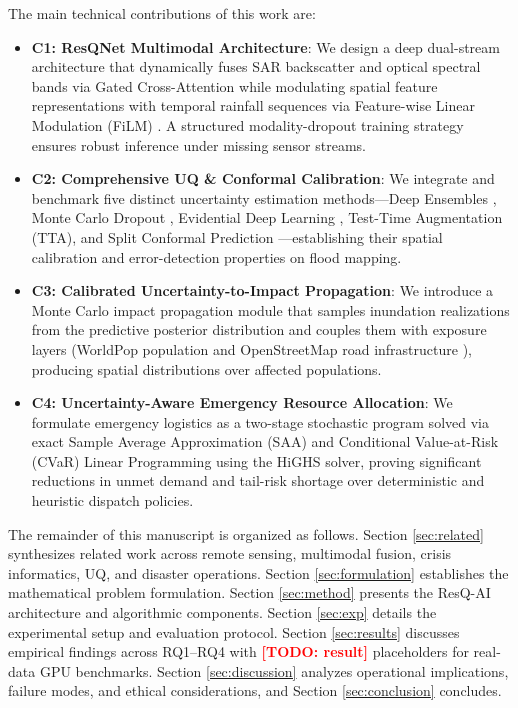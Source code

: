 \documentclass[journal]{IEEEtran}
\newcommand{\TODO}[1]{\textcolor{red}{\textbf{[TODO: #1]}}}
\begin{document}
The main technical contributions of this work are:
\begin{itemize}
    \item \textbf{C1: ResQNet Multimodal Architecture}: We design a deep dual-stream architecture that dynamically fuses SAR backscatter and optical spectral bands via Gated Cross-Attention while modulating spatial feature representations with temporal rainfall sequences via Feature-wise Linear Modulation (FiLM) \cite{perez2018film}. A structured modality-dropout training strategy ensures robust inference under missing sensor streams.
    \item \textbf{C2: Comprehensive UQ & Conformal Calibration}: We integrate and benchmark five distinct uncertainty estimation methods—Deep Ensembles \cite{lakshminarayanan2017}, Monte Carlo Dropout \cite{gal2016}, Evidential Deep Learning \cite{sensoy2018, amini2020}, Test-Time Augmentation (TTA), and Split Conformal Prediction \cite{angelopoulos2021}—establishing their spatial calibration and error-detection properties on flood mapping.
    \item \textbf{C3: Calibrated Uncertainty-to-Impact Propagation}: We introduce a Monte Carlo impact propagation module that samples inundation realizations from the predictive posterior distribution and couples them with exposure layers (WorldPop population \cite{lloyd2019} and OpenStreetMap road infrastructure \cite{haklay2008}), producing spatial distributions over affected populations.
    \item \textbf{C4: Uncertainty-Aware Emergency Resource Allocation}: We formulate emergency logistics as a two-stage stochastic program solved via exact Sample Average Approximation (SAA) and Conditional Value-at-Risk (CVaR) Linear Programming using the HiGHS solver, proving significant reductions in unmet demand and tail-risk shortage over deterministic and heuristic dispatch policies.
\end{itemize}

The remainder of this manuscript is organized as follows. Section \ref{sec:related} synthesizes related work across remote sensing, multimodal fusion, crisis informatics, UQ, and disaster operations. Section \ref{sec:formulation} establishes the mathematical problem formulation. Section \ref{sec:method} presents the ResQ-AI architecture and algorithmic components. Section \ref{sec:exp} details the experimental setup and evaluation protocol. Section \ref{sec:results} discusses empirical findings across RQ1--RQ4 with \TODO{result} placeholders for real-data GPU benchmarks. Section \ref{sec:discussion} analyzes operational implications, failure modes, and ethical considerations, and Section \ref{sec:conclusion} concludes.
\end{document}
